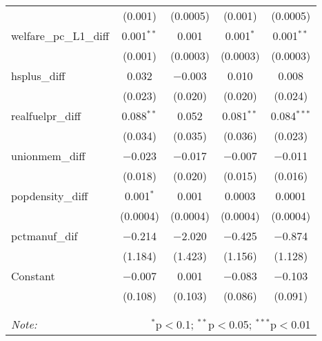 \begin{table}[!htbp]
\begin{tabular}{@{\extracolsep{5pt}}lcccc}
  & (0.001) & (0.0005) & (0.001) & (0.0005) \\ 
  welfare\_pc\_L1\_diff & 0.001$^{**}$ & 0.001 & 0.001$^{*}$ & 0.001$^{**}$ \\ 
  & (0.001) & (0.0003) & (0.0003) & (0.0003) \\ 
  hsplus\_diff & 0.032 & $-$0.003 & 0.010 & 0.008 \\ 
  & (0.023) & (0.020) & (0.020) & (0.024) \\ 
  realfuelpr\_diff & 0.088$^{**}$ & 0.052 & 0.081$^{**}$ & 0.084$^{***}$ \\ 
  & (0.034) & (0.035) & (0.036) & (0.023) \\ 
  unionmem\_diff & $-$0.023 & $-$0.017 & $-$0.007 & $-$0.011 \\ 
  & (0.018) & (0.020) & (0.015) & (0.016) \\ 
  popdensity\_diff & 0.001$^{*}$ & 0.001 & 0.0003 & 0.0001 \\ 
  & (0.0004) & (0.0004) & (0.0004) & (0.0004) \\ 
  pctmanuf\_dif & $-$0.214 & $-$2.020 & $-$0.425 & $-$0.874 \\ 
  & (1.184) & (1.423) & (1.156) & (1.128) \\ 
  Constant & $-$0.007 & 0.001 & $-$0.083 & $-$0.103 \\ 
  & (0.108) & (0.103) & (0.086) & (0.091) \\ 
 \hline \\[-1.8ex] 
\hline 
\hline \\[-1.8ex] 
\textit{Note:}  & \multicolumn{4}{r}{$^{*}$p$<$0.1; $^{**}$p$<$0.05; $^{***}$p$<$0.01} \\ 
\end{tabular} 
\end{table} 
